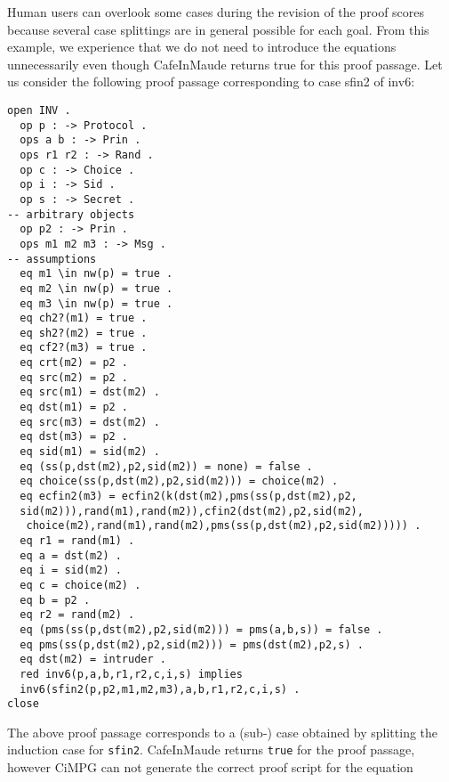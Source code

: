 \documentclass[a4paper,fleqn]{cas-dc}
\begin{document}
Human users can overlook some cases during the revision of the proof scores because several case splittings are in general possible for each goal. From this example, we experience that we do not need to introduce the equations unnecessarily even though CafeInMaude returns true for this proof passage. 
Let us consider the following proof passage corresponding to case sfin2 of inv6:
\begin{small}
\begin{verbatim}
open INV .
  op p : -> Protocol .
  ops a b : -> Prin .
  ops r1 r2 : -> Rand .
  op c : -> Choice .
  op i : -> Sid .
  op s : -> Secret .
-- arbitrary objects
  op p2 : -> Prin .
  ops m1 m2 m3 : -> Msg .
-- assumptions
  eq m1 \in nw(p) = true .
  eq m2 \in nw(p) = true .
  eq m3 \in nw(p) = true .
  eq ch2?(m1) = true .
  eq sh2?(m2) = true .
  eq cf2?(m3) = true .
  eq crt(m2) = p2 .
  eq src(m2) = p2 .
  eq src(m1) = dst(m2) .
  eq dst(m1) = p2 .
  eq src(m3) = dst(m2) .
  eq dst(m3) = p2 .
  eq sid(m1) = sid(m2) .
  eq (ss(p,dst(m2),p2,sid(m2)) = none) = false .
  eq choice(ss(p,dst(m2),p2,sid(m2))) = choice(m2) .
  eq ecfin2(m3) = ecfin2(k(dst(m2),pms(ss(p,dst(m2),p2,
  sid(m2))),rand(m1),rand(m2)),cfin2(dst(m2),p2,sid(m2),
   choice(m2),rand(m1),rand(m2),pms(ss(p,dst(m2),p2,sid(m2))))) .
  eq r1 = rand(m1) .
  eq a = dst(m2) .
  eq i = sid(m2) .
  eq c = choice(m2) .
  eq b = p2 .
  eq r2 = rand(m2) .
  eq (pms(ss(p,dst(m2),p2,sid(m2))) = pms(a,b,s)) = false .
  eq pms(ss(p,dst(m2),p2,sid(m2))) = pms(dst(m2),p2,s) .
  eq dst(m2) = intruder .
  red inv6(p,a,b,r1,r2,c,i,s) implies
  inv6(sfin2(p,p2,m1,m2,m3),a,b,r1,r2,c,i,s) .
close
\end{verbatim}
\end{small}
The above proof passage corresponds to a (sub-) case obtained by splitting the induction case for \verb!sfin2!. CafeInMaude returns \verb!true! for the proof passage, however CiMPG can not generate the correct proof script for the equation 
\end{document}
